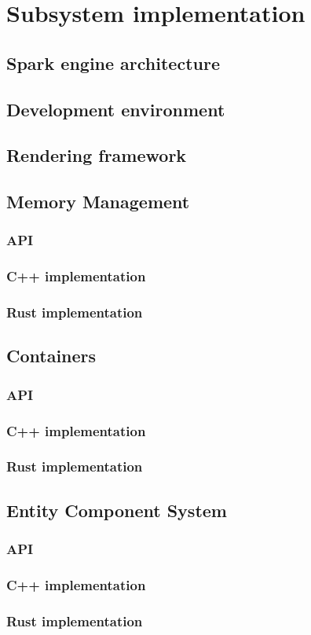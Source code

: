 \chapter{Subsystem implementation}
\blindtext
\section{Spark engine architecture}
\blindtext
\section{Development environment}
\blindtext
\section{Rendering framework}
\blindtext
\section{Memory Management} \label{mem_impl}
\blindtext
\subsection{API}
\blindtext
\subsection{C++ implementation}
\blindtext
\subsection{Rust implementation}
\blindtext
\section{Containers}
\blindtext
\subsection{API}
\blindtext
\subsection{C++ implementation}
\blindtext
\subsection{Rust implementation}
\blindtext
\section{Entity Component System}
\blindtext
\subsection{API}
\blindtext
\subsection{C++ implementation}
\blindtext
\subsection{Rust implementation}
\blindtext
